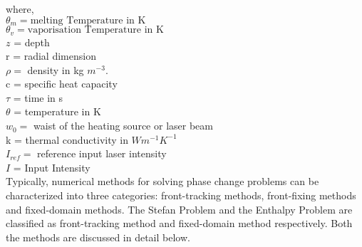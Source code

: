 \noindent where,\\
\indent $\theta_m = \text{melting Temperature in K}$\\
\indent $\theta_v = \text{vaporisation Temperature in K}$\\
\indent $z$ = depth\\
\indent r = radial dimension\\
\indent $\rho = $ density in kg $m^{-3}$.\\
\indent c = specific heat capacity\\
\indent $\tau$ = time in s\\
\indent $\theta$ = temperature in K\\
\indent $w_0 =$ waist of the heating source or laser beam\\
\indent k = thermal conductivity in $W m^{-1} K^{-1}$\\
\indent $I_{ref} =$ reference input laser intensity\\
\indent $I$ = Input Intensity\\

Typically, numerical methods for solving phase change problems can be characterized into three categories: front-tracking methods, front-fixing methods and fixed-domain methods\cite{_2000}. The Stefan Problem and the Enthalpy Problem are classified as front-tracking method and fixed-domain method respectively. Both the methods are discussed in detail below.

